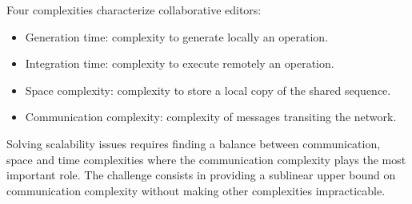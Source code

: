 
\noindent Four complexities characterize collaborative editors:
\begin{itemize}
\item Generation time: complexity to generate locally an operation.
\item Integration time: complexity to execute remotely an operation.
\item Space complexity: complexity to store a local copy of the shared sequence.
\item Communication complexity: complexity of messages transiting the network.
\end{itemize}
Solving scalability issues requires finding a balance between communication,
space and time complexities %
where the communication complexity plays the most important role. The challenge
consists in providing a sublinear upper bound on communication complexity
without making other complexities impracticable.



